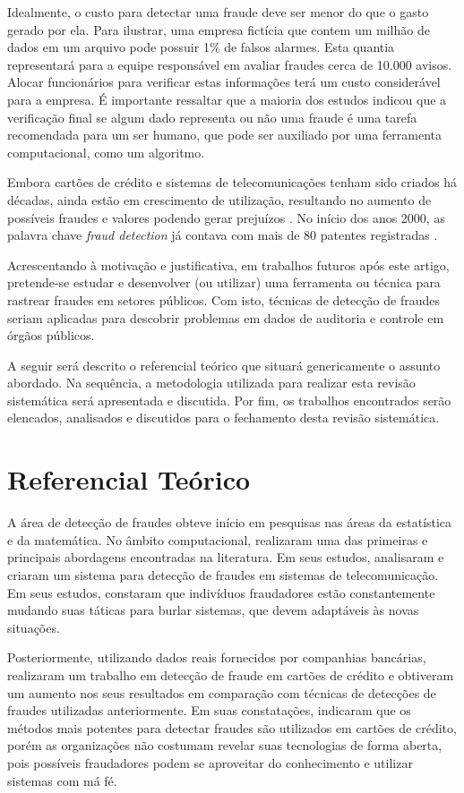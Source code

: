 \documentclass[smallextended]{svjour3}
\begin{document}
Idealmente, o custo para detectar uma fraude deve ser menor do que o gasto gerado por ela. Para ilustrar, uma empresa fictícia que contem um milhão de dados em um arquivo pode possuir 1\% de falsos alarmes. Esta quantia representará para a equipe responsável em avaliar fraudes cerca de 10.000 avisos. Alocar funcionários para verificar estas informações terá um custo considerável para a empresa. É importante ressaltar que a maioria dos estudos indicou que a verificação final se algum dado representa ou não uma fraude é uma tarefa recomendada para um ser humano, que pode ser auxiliado por uma ferramenta computacional, como um algoritmo. 

Embora cartões de crédito e sistemas de telecomunicações tenham sido criados há décadas, ainda estão em crescimento de utilização, resultando no aumento de possíveis fraudes e valores podendo gerar prejuízos \cite{Abdallah2016}. No início dos anos 2000, as palavra chave \emph{fraud detection} já contava com mais de 80 patentes registradas \cite{Bolton2002}.

Acrescentando à motivação e justificativa, em trabalhos futuros após este artigo, pretende-se estudar e desenvolver (ou utilizar) uma ferramenta ou técnica para rastrear fraudes em setores públicos. Com isto, técnicas de detecção de fraudes seriam aplicadas para descobrir problemas em dados de auditoria e controle em órgãos públicos.

A seguir será descrito o referencial teórico que situará genericamente o assunto abordado. Na sequência, a metodologia utilizada para realizar esta revisão sistemática será apresentada e discutida. Por fim, os trabalhos encontrados serão elencados, analisados e discutidos para o fechamento desta revisão sistemática.

\section{Referencial Teórico}
\label{sec:2}

A área de detecção de fraudes obteve início em pesquisas nas áreas da estatística e da matemática. No âmbito computacional, \cite{Fawcett1997} realizaram uma das primeiras e principais abordagens encontradas na literatura. Em seus estudos, analisaram e criaram um sistema para detecção de fraudes em sistemas de telecomunicação. Em seus estudos, constaram que indivíduos fraudadores estão constantemente mudando suas táticas para burlar sistemas, que devem adaptáveis às novas situações.

Posteriormente, utilizando dados reais fornecidos por companhias bancárias, \cite{809570} realizaram um trabalho em detecção de fraude em cartões de crédito e obtiveram um aumento nos seus resultados em comparação com técnicas de detecções de fraudes utilizadas anteriormente. Em suas constatações, indicaram que os métodos mais potentes para detectar fraudes são utilizados em cartões de crédito, porém as organizações não costumam revelar suas tecnologias de forma aberta, pois possíveis fraudadores podem se aproveitar do conhecimento e utilizar sistemas com má fé.
\end{document}
